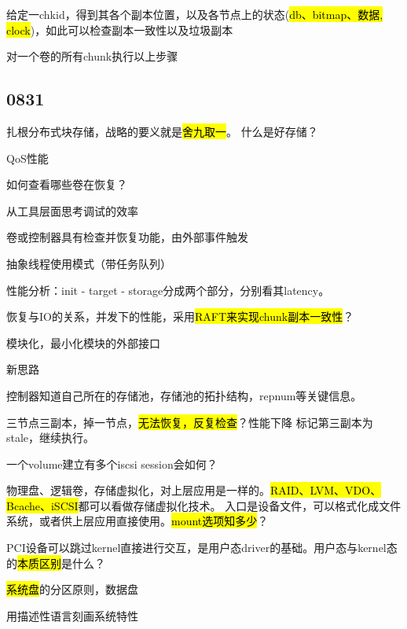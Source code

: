 \begin{enumbox}
\item 给定一chkid，得到其各个副本位置，以及各节点上的状态(\hl{db、bitmap、数据, clock})，如此可以检查副本一致性以及垃圾副本
\item 对一个卷的所有chunk执行以上步骤
\end{enumbox}

\subsection{0831}

扎根分布式块存储，战略的要义就是\hl{舍九取一}。
什么是好存储？

\begin{enumbox}
\item QoS性能
\item 如何查看哪些卷在恢复？
\item 从工具层面思考调试的效率
\item 卷或控制器具有检查并恢复功能，由外部事件触发
\item 抽象线程使用模式（带任务队列）
\item 性能分析：init - target - storage分成两个部分，分别看其latency。
\item 恢复与IO的关系，并发下的性能，采用\hl{RAFT来实现chunk副本一致性}？
\item 模块化，最小化模块的外部接口
\end{enumbox}

新思路
\begin{enumbox}
\item 控制器知道自己所在的存储池，存储池的拓扑结构，repnum等关键信息。
\end{enumbox}

三节点三副本，掉一节点，\hl{无法恢复，反复检查}？性能下降
标记第三副本为stale，继续执行。

一个volume建立有多个iscsi session会如何？

物理盘、逻辑卷，存储虚拟化，对上层应用是一样的。\hl{RAID、LVM、VDO、Bcache、iSCSI}都可以看做存储虚拟化技术。
入口是设备文件，可以格式化成文件系统，或者供上层应用直接使用。\hl{mount选项知多少}？

PCI设备可以跳过kernel直接进行交互，是用户态driver的基础。用户态与kernel态的\hl{本质区别}是什么？

\hl{系统盘}的分区原则，数据盘

用描述性语言刻画系统特性
